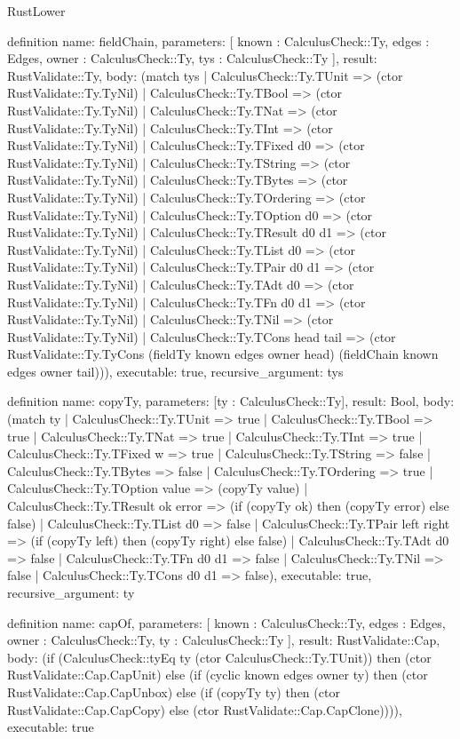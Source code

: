 \begin{lexlean}{RustLower}
\begin{semanticmodule}
definition{
  name: fieldChain,
  parameters: [
    known : CalculusCheck::Ty,
    edges : Edges,
    owner : CalculusCheck::Ty,
    tys : CalculusCheck::Ty
  ],
  result: RustValidate::Ty,
  body: (match tys
    | CalculusCheck::Ty.TUnit => (ctor RustValidate::Ty.TyNil)
    | CalculusCheck::Ty.TBool => (ctor RustValidate::Ty.TyNil)
    | CalculusCheck::Ty.TNat => (ctor RustValidate::Ty.TyNil)
    | CalculusCheck::Ty.TInt => (ctor RustValidate::Ty.TyNil)
    | CalculusCheck::Ty.TFixed d0 => (ctor RustValidate::Ty.TyNil)
    | CalculusCheck::Ty.TString => (ctor RustValidate::Ty.TyNil)
    | CalculusCheck::Ty.TBytes => (ctor RustValidate::Ty.TyNil)
    | CalculusCheck::Ty.TOrdering => (ctor RustValidate::Ty.TyNil)
    | CalculusCheck::Ty.TOption d0 => (ctor RustValidate::Ty.TyNil)
    | CalculusCheck::Ty.TResult d0 d1 => (ctor RustValidate::Ty.TyNil)
    | CalculusCheck::Ty.TList d0 => (ctor RustValidate::Ty.TyNil)
    | CalculusCheck::Ty.TPair d0 d1 => (ctor RustValidate::Ty.TyNil)
    | CalculusCheck::Ty.TAdt d0 => (ctor RustValidate::Ty.TyNil)
    | CalculusCheck::Ty.TFn d0 d1 => (ctor RustValidate::Ty.TyNil)
    | CalculusCheck::Ty.TNil => (ctor RustValidate::Ty.TyNil)
    | CalculusCheck::Ty.TCons head tail => (ctor RustValidate::Ty.TyCons (fieldTy known edges owner head) (fieldChain known edges owner tail))),
  executable: true,
  recursive_argument: tys
}

definition{
  name: copyTy,
  parameters: [ty : CalculusCheck::Ty],
  result: Bool,
  body: (match ty
    | CalculusCheck::Ty.TUnit => true
    | CalculusCheck::Ty.TBool => true
    | CalculusCheck::Ty.TNat => true
    | CalculusCheck::Ty.TInt => true
    | CalculusCheck::Ty.TFixed w => true
    | CalculusCheck::Ty.TString => false
    | CalculusCheck::Ty.TBytes => false
    | CalculusCheck::Ty.TOrdering => true
    | CalculusCheck::Ty.TOption value => (copyTy value)
    | CalculusCheck::Ty.TResult ok error => (if (copyTy ok) then (copyTy error) else false)
    | CalculusCheck::Ty.TList d0 => false
    | CalculusCheck::Ty.TPair left right => (if (copyTy left) then (copyTy right) else false)
    | CalculusCheck::Ty.TAdt d0 => false
    | CalculusCheck::Ty.TFn d0 d1 => false
    | CalculusCheck::Ty.TNil => false
    | CalculusCheck::Ty.TCons d0 d1 => false),
  executable: true,
  recursive_argument: ty
}

definition{
  name: capOf,
  parameters: [
    known : CalculusCheck::Ty,
    edges : Edges,
    owner : CalculusCheck::Ty,
    ty : CalculusCheck::Ty
  ],
  result: RustValidate::Cap,
  body: (if (CalculusCheck::tyEq ty (ctor CalculusCheck::Ty.TUnit)) then (ctor RustValidate::Cap.CapUnit) else (if (cyclic known edges owner ty) then (ctor RustValidate::Cap.CapUnbox) else (if (copyTy ty) then (ctor RustValidate::Cap.CapCopy) else (ctor RustValidate::Cap.CapClone)))),
  executable: true
}


\end{semanticmodule}
\end{lexlean}
